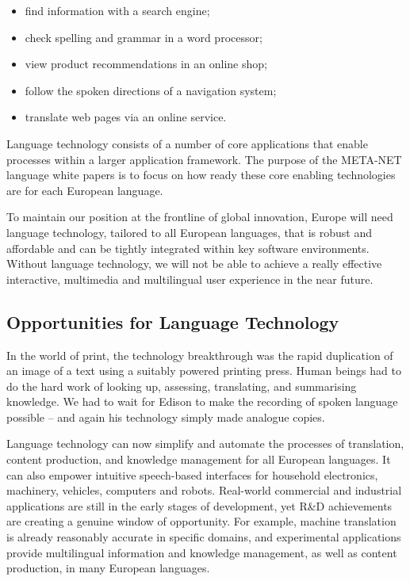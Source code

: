 \documentclass[]{../../metanetpaper}
\begin{document}
\begin{multicols}{2}
\begin{itemize}
\item find information with a search engine;
\item check spelling and grammar in a word processor;
\item view product recommendations in an online shop;
\item follow the spoken directions of a navigation system;
\item translate web pages via an online service.
\end{itemize}

Language technology consists of a number of core applications that enable processes within a larger application framework. The purpose of the META-NET language white papers is to focus on how ready these core enabling technologies are for each European language. 


To maintain our position at the frontline of global innovation, Europe will need language technology, tailored to all European languages, that is robust and affordable and can be tightly integrated within key software environments. Without language technology, we will not be able to achieve a really effective interactive, multimedia and multilingual user experience in the near future.

\subsection{Opportunities for Language Technology}

In the world of print, the technology breakthrough was the rapid duplication of an image of a text using a suitably powered printing press. Human beings had to do the hard work of looking up, assessing, translating, and summarising knowledge. We had to wait for Edison to make the recording of spoken language possible -- and again his technology simply made analogue copies.

Language technology can now simplify and automate the processes of translation, content production, and knowledge management for all European languages. It can also empower intuitive speech-based interfaces for household electronics, machinery, vehicles, computers and robots. Real-world commercial and industrial applications are still in the early stages of development, yet R\&D achievements are creating a genuine window of opportunity. For example, machine translation is already reasonably accurate in specific domains, and experimental applications provide multilingual information and knowledge management, as well as content production, in many European languages. 


\end{multicols}
\end{document}
